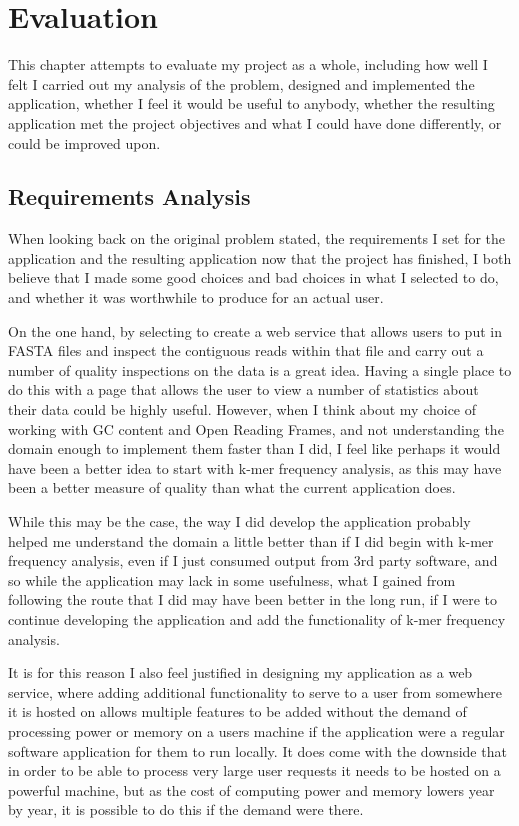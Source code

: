 \chapter{Evaluation}
This chapter attempts to evaluate my project as a whole, including how well I felt I carried out my analysis of the problem, designed and implemented the application, whether I feel it would be useful to anybody, whether the resulting application met the project objectives and what I could have done differently, or could be improved upon.

\section{Requirements Analysis}
When looking back on the original problem stated, the requirements I set for the application and the resulting application now that the project has finished, I both believe that I made some good choices and bad choices in what I selected to do, and whether it was worthwhile to produce for an actual user.

On the one hand, by selecting to create a web service that allows users to put in FASTA files and inspect the contiguous reads within that file and carry out a number of quality inspections on the data is a great idea. Having a single place to do this with a page that allows the user to view a number of statistics about their data could be highly useful. However, when I think about my choice of working with GC content and Open Reading Frames, and not understanding the domain enough to implement them faster than I did, I feel like perhaps it would have been a better idea to start with k-mer frequency analysis, as this may have been a better measure of quality than what the current application does.

While this may be the case, the way I did develop the application probably helped me understand the domain a little better than if I did begin with k-mer frequency analysis, even if I just consumed output from 3rd party software, and so while the application may lack in some usefulness, what I gained from following the route that I did may have been better in the long run, if I were to continue developing the application and add the functionality of k-mer frequency analysis.

It is for this reason I also feel justified in designing my application as a web service, where adding additional functionality to serve to a user from somewhere it is hosted on allows multiple features to be added without the demand of processing power or memory on a users machine if the application were a regular software application for them to run locally. It does come with the downside that in order to be able to process very large user requests it needs to be hosted on a powerful machine, but as the cost of computing power and memory lowers year by year, it is possible to do this if the demand were there.

